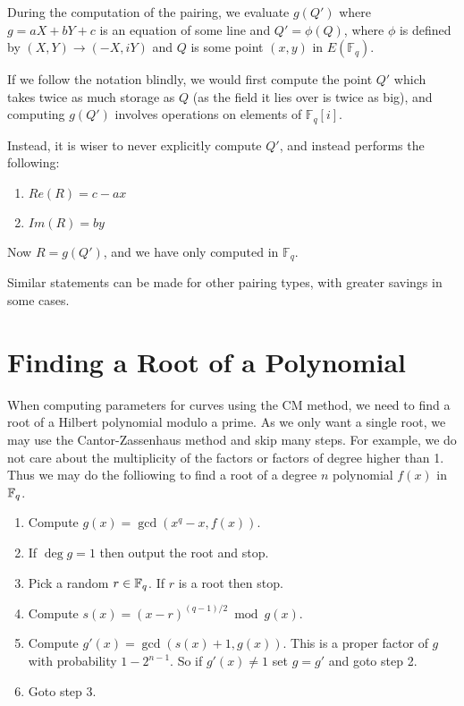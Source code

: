 During the computation of the pairing,
we evaluate $g(Q')$ where $g = aX + bY + c$ is an equation of some line and
$Q' = \phi(Q)$, where $\phi$ is defined by  $(X,Y) \rightarrow (-X, iY)$
and $Q$ is some point $(x,y)$ in $E(\mathbb{F}_q)$.

If we follow the notation blindly, we would first compute the point
$Q'$ which takes twice as much storage as $Q$ (as the field it lies over is
twice as big), and computing $g(Q')$ involves
operations on elements of $\mathbb{F}_q[i]$.

Instead, it is wiser to never explicitly compute $Q'$, and instead
performs the following:

\begin{enumerate}
\item
$Re(R) = c - a x$
\item
$Im(R) = b y$
\end{enumerate}

Now $R = g(Q')$, and we have only computed in $\mathbb{F}_q$.

Similar statements can be made for other pairing types, with greater
savings in some cases.

\section{Finding a Root of a Polynomial}

When computing parameters for curves using the CM method, we
need to find a root of a Hilbert polynomial modulo a prime.
As we only want a single root, we may use the Cantor-Zassenhaus
method and skip many steps. For example, we do not care about
the multiplicity of the factors or factors of degree higher than 1.
Thus we may do the folliowing to find a root of a
degree $n$ polynomial $f(x)$ in
$\mathbb{F}_q$.

\begin{enumerate}
\item
Compute $g(x) = \gcd(x^q - x, f(x))$.
\item
If $\deg g = 1$ then output the root and stop.
\item
Pick a random $r \in \mathbb{F}_q$. If $r$ is a root then stop.
\item
Compute $s(x) = (x-r)^{(q-1)/2} \bmod g(x)$.
\item
Compute $g'(x) = \gcd(s(x)+1, g(x))$. This is a proper factor of $g$
with probability $1 - 2^{n-1}$. So if $g'(x) \ne 1$ set $g = g'$ and
goto step 2.
\item
Goto step 3.
\end{enumerate}
